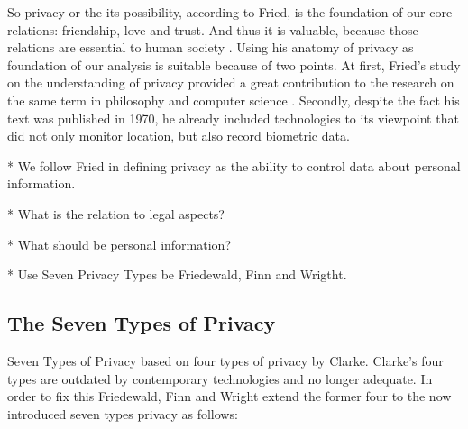 So privacy or the its possibility, according to Fried, is the foundation of our core relations: friendship, love and trust.
And thus it is valuable, because those relations are essential to human society \cite{CFried:Privacy}. 
Using his anatomy of privacy as foundation of our analysis is suitable because of two points.
At first, Fried's study on the understanding of privacy provided a great contribution to the research on the same term in philosophy \cite{sep-privacy} and computer science \cite{SociotechnicalArchitectureForOnlinePrivacy}.
Secondly, despite the fact his text was published in 1970, he already included technologies to its viewpoint that did not only monitor location, but also record biometric data.


* We follow Fried in defining privacy as the ability to control data about personal information.

* What is the relation to legal aspects?

* What should be personal information?

* Use Seven Privacy Types be Friedewald, Finn and Wrigtht.

\subsection{The Seven Types of Privacy}

Seven Types of Privacy based on four types of privacy by Clarke.
Clarke's four types are outdated by contemporary technologies and no longer adequate.
In order to fix this Friedewald, Finn and Wright extend the former four to the now introduced seven types privacy as follows:

